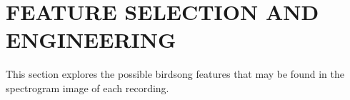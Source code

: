\chapter{FEATURE SELECTION AND ENGINEERING}

This section explores the possible birdsong features that may be found in the
spectrogram image of each recording.
